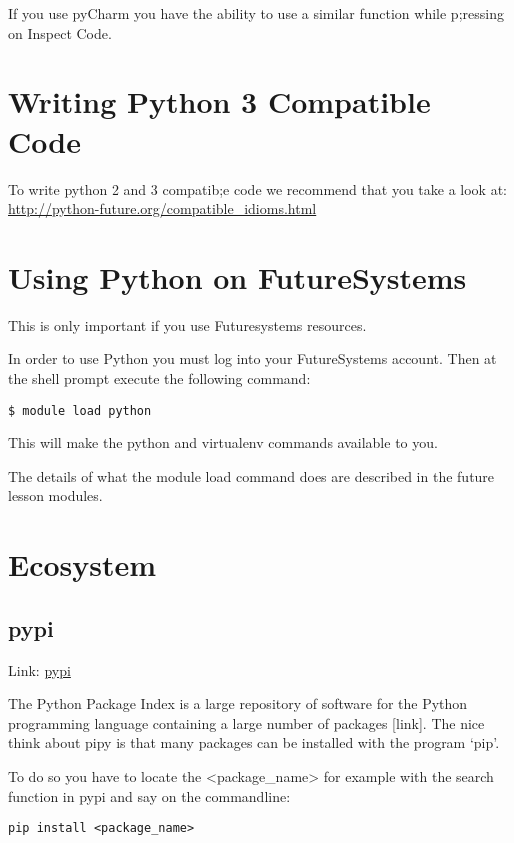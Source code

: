 If you use pyCharm you have the ability to use a similar function while
p;ressing on Inspect Code.

\section{Writing Python 3 Compatible
Code}\label{writing-python-3-compatible-code}

To write python 2 and 3 compatib;e code we recommend that you take a
look at: \url{http://python-future.org/compatible_idioms.html}

\section{Using Python on
FutureSystems}\label{using-python-on-futuresystems}

This is only important if you use Futuresystems resources.

In order to use Python you must log into your FutureSystems account.
Then at the shell prompt execute the following command:

\begin{verbatim}
$ module load python
\end{verbatim}

This will make the python and virtualenv commands available to you.

The details of what the module load command does are described in the
future lesson modules.

\section{Ecosystem}\label{ecosystem}

\subsection{pypi}\label{pypi}

Link: \href{https://pypi.python.org/pypi}{pypi}

The Python Package Index is a large repository of software for the
Python programming language containing a large number of packages
{[}link{]}. The nice think about pipy is that many packages can be
installed with the program `pip'.

To do so you have to locate the \textless{}package\_name\textgreater{}
for example with the search function in pypi and say on the commandline:

\begin{verbatim}
pip install <package_name>
\end{verbatim}

